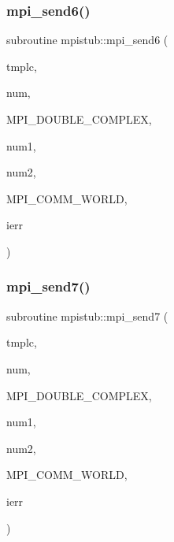\mbox{\label{namespacempistub_a1a0436836f0028c31fba295fbbe17859}} 
\subsubsection{\texorpdfstring{mpi\_send6()}{mpi\_send6()}}
{\footnotesize\ttfamily subroutine mpistub\+::mpi\+\_\+send6 (\begin{DoxyParamCaption}\item[{double complex, dimension(\+:,\+:,\+:)}]{tmplc,  }\item[{}]{num,  }\item[{}]{M\+P\+I\+\_\+\+D\+O\+U\+B\+L\+E\+\_\+\+C\+O\+M\+P\+L\+EX,  }\item[{}]{num1,  }\item[{}]{num2,  }\item[{}]{M\+P\+I\+\_\+\+C\+O\+M\+M\+\_\+\+W\+O\+R\+LD,  }\item[{}]{ierr }\end{DoxyParamCaption})}

\mbox{\label{namespacempistub_a572c98a51712ea28686e837f62e0a660}} 
\subsubsection{\texorpdfstring{mpi\_send7()}{mpi\_send7()}}
{\footnotesize\ttfamily subroutine mpistub\+::mpi\+\_\+send7 (\begin{DoxyParamCaption}\item[{double precision, dimension(\+:,\+:,\+:)}]{tmplc,  }\item[{}]{num,  }\item[{}]{M\+P\+I\+\_\+\+D\+O\+U\+B\+L\+E\+\_\+\+C\+O\+M\+P\+L\+EX,  }\item[{}]{num1,  }\item[{}]{num2,  }\item[{}]{M\+P\+I\+\_\+\+C\+O\+M\+M\+\_\+\+W\+O\+R\+LD,  }\item[{}]{ierr }\end{DoxyParamCaption})}

\mbox{\label{namespacempistub_abc6e6b54dd8f86227143dffe19e34fa4}} 
